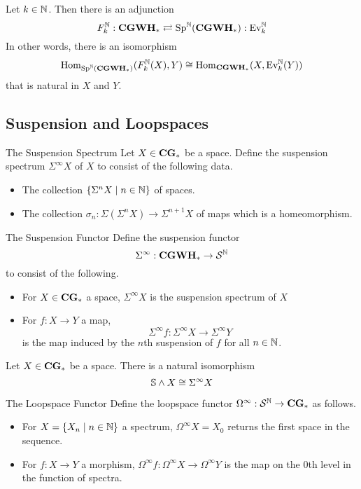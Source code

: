 \documentclass[a4paper]{article}
\begin{document}
\begin{prp}{}{} Let $k\in\N$. Then there is an adjunction $$F_k^\N:\bold{CGWH}_\ast\rightleftarrows\text{Sp}^\N(\bold{CGWH}_\ast):\text{Ev}_k^\N$$ In other words, there is an isomorphism $$\Hom_\bold{\text{Sp}^\N(\bold{CGWH}_\ast)}(F_k^\N(X),Y)\cong\Hom_{\bold{CGWH}_\ast}(X,\text{Ev}_k^\N(Y))$$ that is natural in $X$ and $Y$. 
\end{prp}

\subsection{Suspension and Loopspaces}
\begin{defn}{The Suspension Spectrum}{} Let $X\in\bold{CG}_\ast$ be a space. Define the suspension spectrum $\Sigma^\infty X$ of $X$ to consist of the following data. 
\begin{itemize}
\item The collection $\{\Sigma^n X\;|\;n\in\N\}$ of spaces. 
\item The collection $\sigma_n:\Sigma(\Sigma^nX)\to\Sigma^{n+1}X$ of maps which is a homeomorphism. 
\end{itemize}
\end{defn}

\begin{defn}{The Suspension Functor}{} Define the suspension functor $$\Sigma^\infty:\bold{CGWH}_\ast\to\mS^\N$$ to consist of the following. 
\begin{itemize}
\item For $X\in\bold{CG}_\ast$ a space, $\Sigma^\infty X$ is the suspension spectrum of $X$
\item For $f:X\to Y$ a map, $$\Sigma^\infty f:\Sigma^\infty X\to\Sigma^\infty Y$$ is the map induced by the $n$th suspension of $f$ for all $n\in\N$. 
\end{itemize}
\end{defn}

\begin{prp}{}{} Let $X\in\bold{CG}_\ast$ be a space. There is a natural isomorphism $$\S\wedge X\cong\Sigma^\infty X$$
\end{prp}

\begin{defn}{The Loopspace Functor}{} Define the loopspace functor $\Omega^\infty:\mS^\N\to\bold{CG}_\ast$ as follows. 
\begin{itemize}
\item For $X=\{X_n\;|\;n\in\N\}$ a spectrum, $\Omega^\infty X=X_0$ returns the first space in the sequence. 
\item For $f:X\to Y$ a morphism, $\Omega^\infty f:\Omega^\infty X\to\Omega^\infty Y$ is the map on the $0$th level in the function of spectra. 
\end{itemize}
\end{defn}
\end{document}
